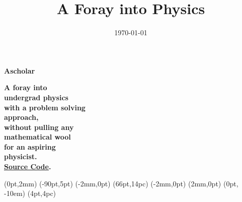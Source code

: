 \documentclass[twoside, 11pt]{memoir}
\date{\today}
\title{A Foray into Physics}
\begin{document}
\pagestyle{empty}

\NewCoffin \result
\NewCoffin \aaa
\NewCoffin \bbb
\NewCoffin \ccc
\NewCoffin \ddd
\NewCoffin \eee
\NewCoffin \fff
\NewCoffin {}
\NewCoffin {}
\NewCoffin {}

\SetHorizontalCoffin \result {}
\SetHorizontalCoffin {}
\SetHorizontalCoffin {}
\SetHorizontalCoffin {}
\SetHorizontalCoffin {}
\SetVerticalCoffin \eee {180pt}
               {\raggedleft\fontsize{31}{36}\sffamily\bfseries
               Ascholar}
\SetVerticalCoffin \fff {140pt}
               {\raggedright \fontsize{13}{14}\sffamily\bfseries
                     A foray into \\
                     undergrad physics \\
                     with a problem solving \\
                      approach, \\
                      without pulling any\\
                     mathematical wool\\
                     for an aspiring\\
                     physicist. \\
                     \href{https://github.com/Anonscholar}{Source Code}.\\}

\RotateCoffin {}
\RotateCoffin {}

\SetHorizontalCoffin {}
\SetHorizontalCoffin {}
\SetHorizontalCoffin {}


\JoinCoffins \result                \aaa
\JoinCoffins {} (0pt,2mm)
\JoinCoffins {} \bbb     [B,r](-90pt,5pt)
\JoinCoffins {} (-2mm,0pt)
\JoinCoffins {} \ccc     [B,l](66pt,14pc)
\JoinCoffins {} \fff     [t,r](-2mm,0pt)
\JoinCoffins {} (2mm,0pt)
\JoinCoffins {} \eee     [B,r] (0pt, -10em)
\JoinCoffins {} \ddd     [B,r](4pt,4pc)
\end{document}
